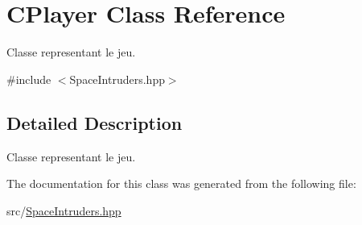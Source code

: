\hypertarget{class_c_player}{}\section{C\+Player Class Reference}
\label{class_c_player}


Classe representant le jeu.  




{\ttfamily \#include $<$Space\+Intruders.\+hpp$>$}



\subsection{Detailed Description}
Classe representant le jeu. 

The documentation for this class was generated from the following file\+:\begin{DoxyCompactItemize}
\item 
src/\hyperlink{_space_intruders_8hpp}{Space\+Intruders.\+hpp}\end{DoxyCompactItemize}
